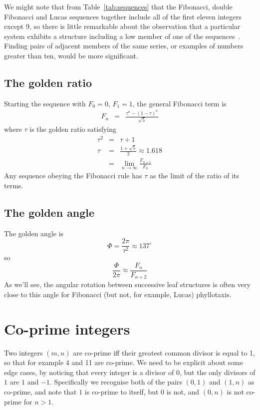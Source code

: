 We might note that from Table~\ref{tab:sequences} that the Fibonacci, double Fibonacci and Lucas sequences together include all  of the first eleven integers except 9, so there is little remarkable about the observation that a particular system exhibits a structure including a low member of one of the sequences~\cite{cookeFibonacciNumbersReveal2006}. Finding pairs of adjacent members of the same series, or examples of numbers greater than ten, would be more significant.

\subsection{The golden ratio}
Starting the sequence with $F_0=0$, $F_1=1$, the general Fibonacci term is 
\begin{eqnarray}
F_n &=& \frac{\tau^n - (1-\tau)^n}{\sqrt{5}}
\end{eqnarray}
where $\tau$ is the golden ratio 
satisfying
\begin{eqnarray}
\tau^2 &=& \tau+1
\\
\tau &=& \frac{1+\sqrt{5}}{2} \approx 1.618
\\
&=& \lim_{n\rightarrow\infty} \frac{F_{n+1}}{F_n} 
\end{eqnarray}
Any sequence obeying the Fibonacci rule has $\tau$  as the limit of the ratio of its terms.

\subsection{The golden angle}
The golden angle is
\[
\Phi = \frac{2\pi}{\tau^2}  \approx 137^\circ
\]
so
\[
\frac{\Phi}{2 \pi} \approx \frac{F_{n}}{F_{n+2}}
\]
As we'll see, the angular rotation between successive leaf structures is often very close to this angle for Fibonacci (but not, for example, Lucas) phyllotaxis.




\section{Co-prime integers}

\label{sec:coprime}
Two integers $(m,n)$ are co-prime iff their greatest common divisor is equal to 1, so that for example 4 and 11 are co-prime. We need to be explicit about some edge cases, by noticing that every integer is a divisor of $0$, but the only divisors of $1$ are $1$ and $-1$. Specifically we recognise both of the pairs $(0,1)$ and $(1,n)$ as co-prime, and note that $1$ is co-prime to itself, but $0$ is not, and $(0,n)$ is not co-prime for $n>1$.%
